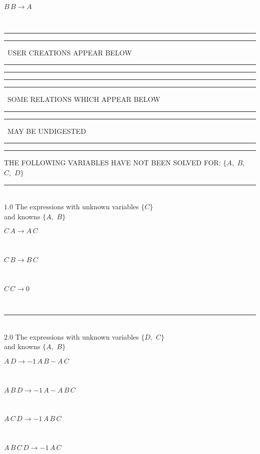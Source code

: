 \documentclass[rep10,leqno]{report}
\begin{document}
\begin{minipage}{6in}
$
B\,
 B\rightarrow A
$
\end{minipage}\\
\rule[2pt]{6in}{1pt}\hfil\break
\rule[2.5pt]{1.701in}{1pt}
\ USER CREATIONS APPEAR BELOW\ 
\rule[2.5pt]{1.701in}{1pt}\hfil\break
\rule[2pt]{6in}{1pt}\hfil\break
\rule[2pt]{6in}{4pt}\hfil\break
\rule[2pt]{1.45in}{4pt}
\ SOME RELATIONS WHICH APPEAR BELOW\ 
\rule[2pt]{1.45in}{4pt}\hfil\break
\rule[2pt]{2.18in}{4pt}
\ MAY BE UNDIGESTED\ 
\rule[2pt]{2.18in}{4pt}\hfil\break
\rule[2pt]{6in}{4pt}\hfil\break
THE FOLLOWING VARIABLES HAVE NOT BEEN SOLVED FOR:\hfil\break
$\{A,
$ $
B,
$ $
C,
$ $
D\}$
\smallskip\\
\rule[3pt]{6in}{.7pt}\\
$1.0$  The expressions with unknown variables $\{C\}$\\
and knowns $\{A,
$ $
B\}$\smallskip\\
\begin{minipage}{6in}
$
C\,
 A\rightarrow A\,
 C
$
\end{minipage}\medskip \\
\begin{minipage}{6in}
$
C\,
 B\rightarrow B\,
 C
$
\end{minipage}\medskip \\
\begin{minipage}{6in}
$
C\,
 C\rightarrow 0
$
\end{minipage}\\
\rule[3pt]{6in}{.7pt}\\
$2.0$  The expressions with unknown variables $\{D,
$ $
C\}$\\
and knowns $\{A,
$ $
B\}$\smallskip\\
\begin{minipage}{6in}
$
A\,
 D\rightarrow -1\,
 A\,
 B - A\,
 C
$
\end{minipage}\medskip \\
\begin{minipage}{6in}
$
A\,
 B\,
 D\rightarrow -1\,
 A - A\,
 B\,
 C
$
\end{minipage}\medskip \\
\begin{minipage}{6in}
$
A\,
 C\,
 D\rightarrow -1\,
 A\,
 B\,
 C
$
\end{minipage}\medskip \\
\begin{minipage}{6in}
$
A\,
 B\,
 C\,
 D\rightarrow -1\,
 A\,
 C
$
\end{minipage}\\
\vspace{10pt}
\end{document}

